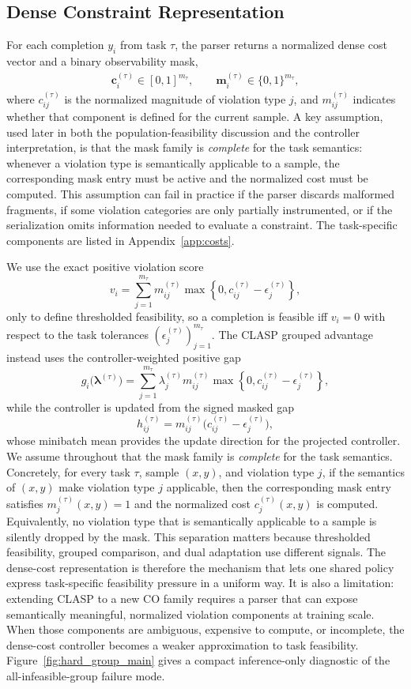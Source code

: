 \documentclass{article}
\theoremstyle{remark}
\begin{document}
\subsection{Dense Constraint Representation}
For each completion \(y_i\) from task \(\tau\), the parser returns a normalized dense cost vector and a binary observability mask,
\begin{align}
\mathbf{c}_i^{(\tau)} \in [0,1]^{m_\tau}, \qquad
\mathbf{m}_i^{(\tau)} \in \{0,1\}^{m_\tau},
\end{align}
where \(c_{ij}^{(\tau)}\) is the normalized magnitude of violation type \(j\), and \(m_{ij}^{(\tau)}\) indicates whether that component is defined for the current sample. A key assumption, used later in both the population-feasibility discussion and the controller interpretation, is that the mask family is \emph{complete} for the task semantics: whenever a violation type is semantically applicable to a sample, the corresponding mask entry must be active and the normalized cost must be computed. This assumption can fail in practice if the parser discards malformed fragments, if some violation categories are only partially instrumented, or if the serialization omits information needed to evaluate a constraint. The task-specific components are listed in Appendix~\ref{app:costs}.

We use the exact positive violation score
\[
v_i = \sum_{j=1}^{m_\tau} m_{ij}^{(\tau)}\max\!\left\{0,c_{ij}^{(\tau)}-\epsilon_j^{(\tau)}\right\},
\]
only to define thresholded feasibility, so a completion is feasible iff \(v_i=0\) with respect to the task tolerances \((\epsilon_j^{(\tau)})_{j=1}^{m_\tau}\). The CLASP grouped advantage instead uses the controller-weighted positive gap
\[
g_i\bigl(\boldsymbol{\lambda}^{(\tau)}\bigr)
=
\sum_{j=1}^{m_\tau} \lambda_j^{(\tau)} m_{ij}^{(\tau)}\max\!\left\{0,c_{ij}^{(\tau)}-\epsilon_j^{(\tau)}\right\},
\]
while the controller is updated from the signed masked gap
\[
h_{ij}^{(\tau)} = m_{ij}^{(\tau)}\bigl(c_{ij}^{(\tau)}-\epsilon_j^{(\tau)}\bigr),
\]
whose minibatch mean provides the update direction for the projected controller.
We assume throughout that the mask family is \emph{complete} for the task semantics. Concretely, for every task \(\tau\), sample \((x,y)\), and violation type \(j\), if the semantics of \((x,y)\) make violation type \(j\) applicable, then the corresponding mask entry satisfies \(m_j^{(\tau)}(x,y)=1\) and the normalized cost \(c_j^{(\tau)}(x,y)\) is computed. Equivalently, no violation type that is semantically applicable to a sample is silently dropped by the mask. This separation matters because thresholded feasibility, grouped comparison, and dual adaptation use different signals.
The dense-cost representation is therefore the mechanism that lets one shared policy express task-specific feasibility pressure in a uniform way. It is also a limitation: extending CLASP to a new CO family requires a parser that can expose semantically meaningful, normalized violation components at training scale. When those components are ambiguous, expensive to compute, or incomplete, the dense-cost controller becomes a weaker approximation to task feasibility.
Figure~\ref{fig:hard_group_main} gives a compact inference-only diagnostic of the all-infeasible-group failure mode.
\end{document}
